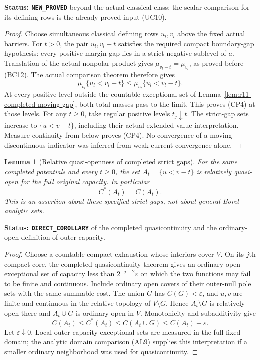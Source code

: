 \documentclass[11pt,a4paper]{article}
\numberwithin{equation}{section}
\newtheorem{lemma}[theorem]{Lemma}
\theoremstyle{definition}
\theoremstyle{remark}
\begin{document}
\noindent\textbf{Status: \texttt{NEW\_PROVED}} beyond the actual
classical class; the scalar comparison for its defining rows is
the already proved input (UC10).

\begin{proof}
Choose simultaneous classical defining rows $u_l,v_l$ above
the fixed actual barriers. For $t>0$, the pair $u_l,v_l-t$
satisfies the required compact boundary-gap hypothesis:
every positive-margin gap lies in a strict negative sublevel
of $a$. Translation of the actual nonpolar product gives
$\mu_{v_l-t}=\mu_{v_l}$, as proved before (BC12).
The actual comparison theorem therefore gives
\[
                   \mu_{v_l}\{u_l<v_l-t\}
                           \leq\mu_{u_l}\{u_l<v_l-t\}.
 \tag{CP5}
\]
At every positive level outside the countable exceptional set
of Lemma~\ref{lem:r11-completed-moving-gap}, both total masses
pass to the limit. This proves (CP4) at those levels.
For any $t\geq0$, take regular positive levels $t_j\downarrow t$.
The strict-gap sets increase to $\{u<v-t\}$, including their
actual extended-value interpretation. Measure continuity from
below proves (CP4). No convergence of a moving discontinuous
indicator was inferred from weak current convergence alone.
\end{proof}

\begin{lemma}[Relative quasi-openness of completed strict gaps]
\label{lem:r11-completed-gap-outer}
For the same completed potentials and every $t\geq0$, the set
$A_t=\{u<v-t\}$ is relatively quasi-open for the full original
capacity. In particular
\[
                              C^*(A_t)=C(A_t).
 \tag{CP6}
\]
This is an assertion about these specified strict gaps, not
about general Borel analytic sets.
\end{lemma}

\noindent\textbf{Status: \texttt{DIRECT\_COROLLARY}} of the
completed quasicontinuity and the ordinary-open definition of
outer capacity.

\begin{proof}
Choose a countable compact exhaustion whose interiors cover $V$.
On its $j$th compact core, the completed quasicontinuity theorem
gives an ordinary open exceptional set of capacity less than
$2^{-j-2}\varepsilon$ on which the two functions may fail to be
finite and continuous. Include ordinary open covers of their
outer-null pole sets with the same summable cost. The union
$G$ has $C(G)<\varepsilon$, and $u,v$ are finite and continuous
in the relative topology of $V\setminus G$. Hence
$A_t\setminus G$ is relatively open there and $A_t\cup G$
is ordinary open in $V$. Monotonicity and subadditivity give
\[
 C(A_t)\leq C^*(A_t)\leq C(A_t\cup G)
                                      \leq C(A_t)+\varepsilon.
\]
Let $\varepsilon\downarrow0$. Local outer-capacity exceptional
sets are measured in the full fixed domain; the analytic domain
comparison (AL9) supplies this interpretation if a smaller
ordinary neighborhood was used for quasicontinuity.
\end{proof}
\end{document}
